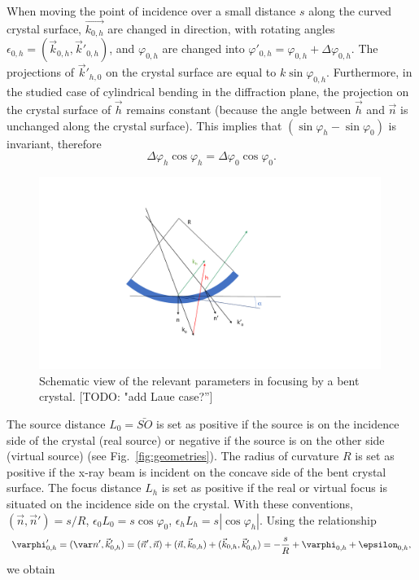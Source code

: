 \documentclass[preprint]{iucr}              %
\newcommand{\todo}[1]{{\color{red}[TODO: "#1'']}}
\newcommand{\inblue}[1]{{\color{blue}#1}}
\begin{document}
When moving the point of incidence over a small distance $s$ along the curved crystal surface, $\vec{k_{0,h}}$ are changed in direction, with rotating angles $\epsilon_{0,h} = (\vec k_{0,h},\vec k'_{0,h})$, and $\varphi_{0,h}$ are changed into $\varphi'_{0,h}=\varphi_{0,h}+\Delta \varphi_{0,h}$.
The projections of  $\vec k'_{h,0}$ \inblue{on the crystal surface} are equal to $k\sin\varphi_{0,h}$. Furthermore, in the studied case of cylindrical bending \inblue{in the diffraction plane}, the projection on the crystal surface of $\vec h$ remains constant \inblue{(because the angle between $\vec h$ and $\vec n$ is unchanged along the crystal surface).
}
This implies that $(\sin \varphi_h - \sin \varphi_0)$ is invariant, therefore
\begin{equation}
\label{eq:invariant}
    \Delta \varphi_h \cos\varphi_h = \Delta \varphi_0 \cos\varphi_0.
\end{equation}

\begin{figure}
\label{fig:vectors}
\caption{Schematic view of the relevant parameters in focusing by a bent crystal. \todo{add Laue case?}
}
\includegraphics[width=0.99\textwidth,trim=5cm 2cm 10cm 2cm,clip=true]{fig_vectors.pdf}
\end{figure}

The source distance $L_0=\bar{SO}$ is set as positive if the source is on the incidence side of the crystal (real source) or negative if the source is on the other side (virtual source) (see Fig.~\ref{fig:geometries}). The radius of curvature $R$ is set as positive if the x-ray beam is incident on the concave side of the bent crystal surface. The focus distance $L_h$ is set as positive if the real or virtual focus is situated on the incidence side on the crystal. With these conventions, $(\vec n,\vec n')=s/R$, $\epsilon_0 L_0 = s \cos\varphi_0$,  $\epsilon_h L_h = s |\cos\varphi_h|$. Using the relationship
\begin{equation}
    \varphi'_{0,h} = 
    (\var n',  \vec k'_{0,h}) = 
    (\vec n', \vec n) + (\vec n,\vec k_{0,h}) + (\vec k_{0,h}, \vec k'_{0,h}) = -\frac{s}{R} + \varphi_{0,h} + \epsilon_{0,h},
\end{equation}
we obtain
\end{document}

